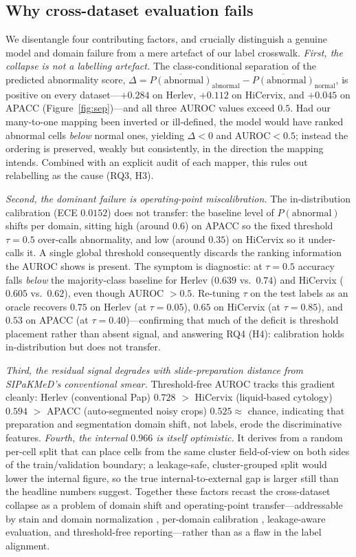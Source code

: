 \documentclass[twocolumn]{article}
\begin{document}
\subsection{Why cross-dataset evaluation fails}

We disentangle four contributing factors, and crucially distinguish a genuine model and domain failure from a mere artefact of our label crosswalk. \emph{First, the collapse is not a labelling artefact.} The class-conditional separation of the predicted abnormality score, $\Delta = \overline{P(\text{abnormal})}_{\text{abnormal}} - \overline{P(\text{abnormal})}_{\text{normal}}$, is positive on every dataset---$+0.284$ on Herlev, $+0.112$ on HiCervix, and $+0.045$ on APACC (Figure~\ref{fig:sep})---and all three AUROC values exceed $0.5$. Had our many-to-one mapping been inverted or ill-defined, the model would have ranked abnormal cells \emph{below} normal ones, yielding $\Delta<0$ and AUROC$<0.5$; instead the ordering is preserved, weakly but consistently, in the direction the mapping intends. Combined with an explicit audit of each mapper, this rules out relabelling as the cause (RQ3, H3).

\emph{Second, the dominant failure is operating-point miscalibration.} The in-distribution calibration (ECE $0.0152$) does not transfer: the baseline level of $P(\text{abnormal})$ shifts per domain, sitting high (around $0.6$) on APACC so the fixed threshold $\tau=0.5$ over-calls abnormality, and low (around $0.35$) on HiCervix so it under-calls it. A single global threshold consequently discards the ranking information the AUROC shows is present. The symptom is diagnostic: at $\tau=0.5$ accuracy falls \emph{below} the majority-class baseline for Herlev ($0.639$ vs.\ $0.74$) and HiCervix ($0.605$ vs.\ $0.62$), even though AUROC $>0.5$. Re-tuning $\tau$ on the test labels as an oracle recovers $0.75$ on Herlev (at $\tau=0.05$), $0.65$ on HiCervix (at $\tau=0.85$), and $0.53$ on APACC (at $\tau=0.40$)---confirming that much of the deficit is threshold placement rather than absent signal, and answering RQ4 (H4): calibration holds in-distribution but does not transfer.

\emph{Third, the residual signal degrades with slide-preparation distance from SIPaKMeD's conventional smear.} Threshold-free AUROC tracks this gradient cleanly: Herlev (conventional Pap) $0.728$ $>$ HiCervix (liquid-based cytology) $0.594$ $>$ APACC (auto-segmented noisy crops) $0.525\approx$ chance, indicating that preparation and segmentation domain shift, not labels, erode the discriminative features. \emph{Fourth, the internal $0.966$ is itself optimistic.} It derives from a random per-cell split that can place cells from the same cluster field-of-view on both sides of the train/validation boundary; a leakage-safe, cluster-grouped split would lower the internal figure, so the true internal-to-external gap is larger still than the headline numbers suggest. Together these factors recast the cross-dataset collapse as a problem of domain shift and operating-point transfer---addressable by stain and domain normalization \citep{macenko2009stain}, per-domain calibration \citep{guo2017calibration}, leakage-aware evaluation, and threshold-free reporting---rather than as a flaw in the label alignment.
\end{document}

